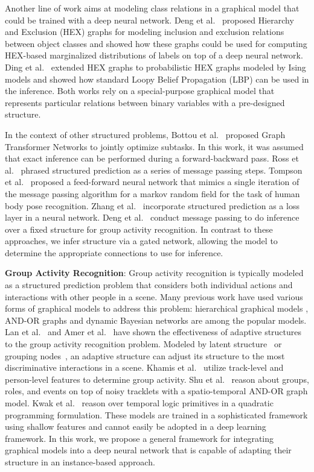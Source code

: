 \documentclass[10pt,twocolumn,letterpaper]{article}
\begin{document}
Another line of work aims at modeling class relations in a graphical model that could be trained with a deep neural network. Deng et al.~\cite{Deng14large} proposed Hierarchy and Exclusion (HEX) graphs for modeling inclusion and exclusion relations between object classes and showed how these graphs could be used for computing HEX-based marginalized distributions of labels on top of a deep neural network.
Ding et al.~\cite{DingDMN15} extended HEX graphs to probabilistic HEX graphs modeled by Ising models and showed how standard Loopy Belief Propagation (LBP)
can be used in the inference. Both works rely on a special-purpose graphical model that represents particular relations between binary variables with a pre-designed structure. 

In the context of other structured problems, Bottou et al.~\cite{BottouBL97} proposed Graph Transformer Networks to jointly optimize subtasks. In this work, it was assumed that exact inference can be performed during a forward-backward pass. Ross et al.~\cite{RossMHB11} phrased structured prediction as a series of message passing steps.  Tompson et al.~\cite{tompson2014joint} proposed a feed-forward neural network that mimics a single iteration of the message passing algorithm for a markov random field for the task of human body pose recognition.  
Zhang et al.~\cite{zhang2015improving} incorporate structured prediction as a loss layer in a neural network.  Deng et al.~\cite{DengZCLMRM15} conduct message passing to do inference over a fixed structure for group activity recognition.  In contrast to these approaches, we infer structure via a gated network, allowing the model to determine the appropriate connections to use for inference.

{\bf Group Activity Recognition}:
Group activity recognition is typically modeled as a structured prediction problem that considers both individual actions and interactions with other people in a scene. Many previous work have used various forms of graphical models to address this problem: hierarchical graphical models \cite{amer2014hirf, LanSM12, LanWYRM12, RyooA11, choi_eccv12},
AND-OR graphs \cite{Amer2012cost, Gupta2009understanding} and  dynamic Bayesian networks \cite{zhu2013context} are among the popular models. 
Lan et al.~\cite{LanWYRM12} and Amer et al.~\cite{amer2014hirf} have shown the effectiveness of adaptive structures to the group activity recognition problem. Modeled by latent structure~\cite{LanWYRM12} or grouping nodes~\cite{amer2014hirf}, an adaptive structure
can adjust its structure to the most discriminative interactions in a scene. Khamis et al.~\cite{SamehCVPR12,SamehECCV12} utilize track-level and person-level features to determine group activity.
Shu et al.~\cite{ShuXRTZ15} reason about groups, roles, and events on top of noisy tracklets with a spatio-temporal AND-OR graph model.
Kwak et al.~\cite{KwakHH13} reason over temporal logic primitives in a quadratic programming formulation.
These models are trained in a sophisticated framework using shallow features and cannot easily be adopted in a deep learning framework.
In this work, we propose a general framework for integrating graphical models into a deep neural network that is capable of adapting their structure in an instance-based approach. 
\end{document}
